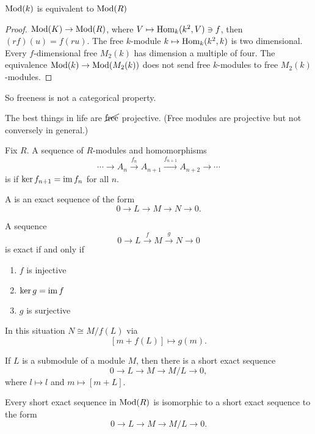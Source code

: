   \begin{prop}
    $\operatorname{Mod}(k)$ is equivalent to $\operatorname{Mod}(R)$
  \end{prop}
  \begin{proof}
    $\operatorname{Mod}(K) \to \operatorname{Mod}(R)$, where $V \mapsto \operatorname{Hom}_k(k^2,V) \ni f$, then
    $(rf)(u) = f(ru)$. The free $k$-module $k\mapsto \operatorname{Hom}_k(k^2,k)$ is two
    dimensional. Every $f$-dimensional free $M_2(k)$ has dimension a multiple
    of four. The equivalence $\operatorname{Mod}(k)\to \operatorname{Mod}(M_2(k))$ does not send free
    $k$-modules to free $M_2(k)$-modules.
  \end{proof}

  So freeness is not a categorical property.

  The best things in life are $\cancel{\text{free}}$ projective. (Free modules
  are projective but not conversely in general.)

  \begin{define}
    Fix $R$. A sequence of $R$-modules and homomorphisms
    \[ \cdots \to A_n \stackrel{f_n}{\to} A_{n+1} \stackrel{f_{n+1}}{\to} A_{n+2} \to \cdots \]
    is  if $\ker{f_{n+1}} = \operatorname{im}{f_n}$ for all $n$.
  \end{define}
  \begin{define}
    A  is an exact sequence of the form
    \[ 0 \to L \to M \to N \to 0. \]
  \end{define}

  \begin{lemma}
    A sequence
    \[ 0 \to L \stackrel{f}{\to} M \stackrel{g}{\to} N \to 0 \]
    is exact if and only if
    \begin{enumerate}
      \item $f$ is injective
      \item $\ker{g} = \operatorname{im}{f}$
      \item $g$ is surjective
    \end{enumerate}
  \end{lemma}

  In this situation $N \cong M/f(L)$ via
  \[ [m+f(L)] \mapsto g(m). \]

  If $L$ is a submodule of a module $M$, then there is a short exact sequence
  \[ 0 \to L \to M \to M/L \to 0, \]
  where $l\mapsto l$ and $m\mapsto [m+L]$.

  Every short exact sequence in $\operatorname{Mod}(R)$ is isomorphic to a short exact
  sequence to the form
  \[ 0 \to L \to M \to M/L \to 0. \]
